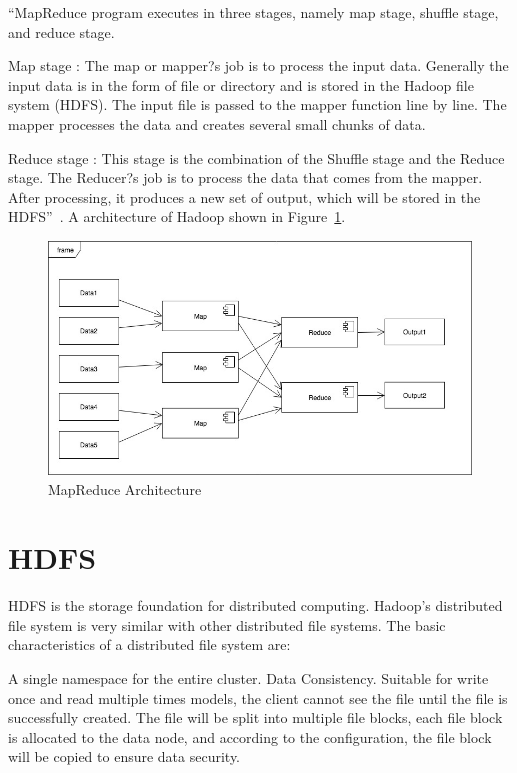 ``MapReduce program executes in three stages, namely map stage, shuffle stage, and reduce stage.

Map stage : The map or mapper?s job is to process the input data. Generally the input data is in the form of file or directory and is stored in the Hadoop file system (HDFS). The input file is passed to the mapper function line by line. The mapper processes the data and creates several small chunks of data.

Reduce stage : This stage is the combination of the Shuffle stage and the Reduce stage. The Reducer?s job is to process the data that comes from the mapper. After processing, it produces a new set of output, which will be stored in the HDFS''~\cite{mapreduce}.
A architecture of Hadoop shown in Figure~\ref{f:fly}.

\begin{figure}[!ht]
  \centering\includegraphics[width=\columnwidth]{images/mapReduce.jpg}
  \caption{MapReduce Architecture}\label{f:fly}
\end{figure}

\section{HDFS}
HDFS is the storage foundation for distributed computing. Hadoop's distributed file system is very similar with other distributed file systems. The basic characteristics of a distributed file system are: 

A single namespace for the entire cluster.
Data Consistency.
Suitable for write once and read multiple times models, the client cannot see the file until the file is successfully created. The file will be split into multiple file blocks, each file block is allocated to the data node, and according to the configuration, the file block will be copied to ensure data security.

